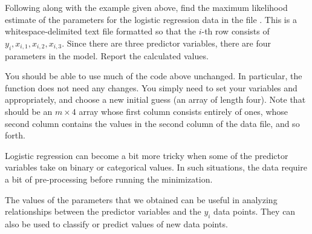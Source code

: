 \begin{problem}
Following along with the example given above, find the maximum likelihood estimate of the parameters for
the logistic regression data in the file . This is a whitespace-delimited text file
formatted so that the $i$-th row consists of $y_i, x_{i,1}, x_{i,2}, x_{i,3}.$ Since there are three
predictor variables, there are four parameters in the model. Report the calculated values.

You should be able to use much of the code above unchanged. In particular, the function  does
not need any changes. You simply need to set your variables  and  appropriately, and
choose a new initial guess (an array of length four). Note that  should be an $m \times 4$ array whose first
column consists entirely of ones, whose second column contains the values in the second column of the data file,
and so forth.
\end{problem}

Logistic regression can become a bit more tricky when some of the predictor variables take on binary or categorical
values. In such situations, the data require a bit of pre-processing before running the minimization.

The values of the parameters that we obtained can be useful in analyzing relationships
between the predictor variables and the $y_i$ data points. They can also be used to classify or predict values of new
data points.





